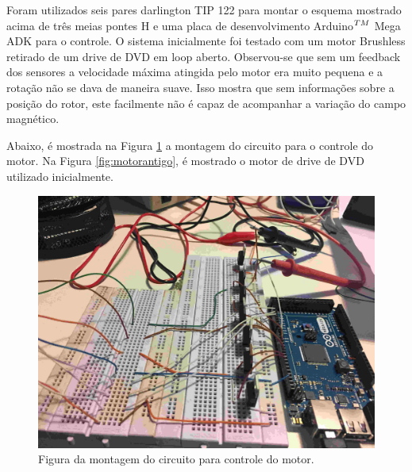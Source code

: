 \documentclass[10pt,fleqn,a4paper]{article}
\begin{document}
    Foram utilizados seis pares darlington TIP 122 para montar o esquema mostrado acima de três meias pontes H e uma placa de desenvolvimento Arduino$^{\small{TM}}$ Mega ADK para o controle. O sistema inicialmente foi testado com um motor Brushless retirado de um drive de DVD em loop aberto. Observou-se que sem um feedback dos sensores a velocidade máxima atingida pelo motor era muito pequena e a rotação não se dava de maneira suave. Isso mostra que sem informações sobre a posição do rotor, este facilmente não é capaz de acompanhar a variação do campo magnético.
    
    Abaixo, é mostrada na Figura \ref{fig:montagemcircuito} a montagem do circuito para o controle do motor. Na Figura \ref{fig:motorantigo}, é mostrado o motor de drive de DVD utilizado inicialmente.

	\begin{figure}[ht]
		\begin{center}
			\includegraphics[angle=0, scale=0.06]{images/montagemcircuito}
		\end{center}
		\caption{Figura da montagem do circuito para controle do motor.}
		\label{fig:montagemcircuito}
	\end{figure}
\end{document}
